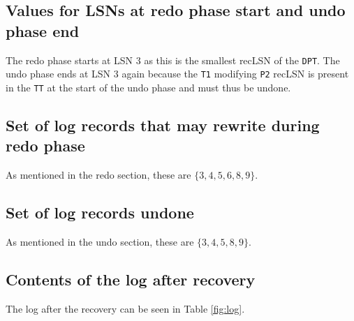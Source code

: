 \subsection{Values for LSNs at redo phase start and undo phase end}
The redo phase starts at LSN 3 as this is the smallest recLSN of the {\tt DPT}. The undo phase ends at LSN 3 again because the {\tt T1} modifying {\tt P2} recLSN is present in the {\tt TT} at the start of the undo phase and must thus be undone.

\subsection{Set of log records that may rewrite during redo phase}
As mentioned in the redo section, these are $\{3,4,5,6,8,9\}$.

\subsection{Set of log records undone}
As mentioned in the undo section, these are $\{3,4,5,8,9\}$.

\subsection{Contents of the log after recovery}
The log after the recovery can be seen in Table \ref{fig:log}.

